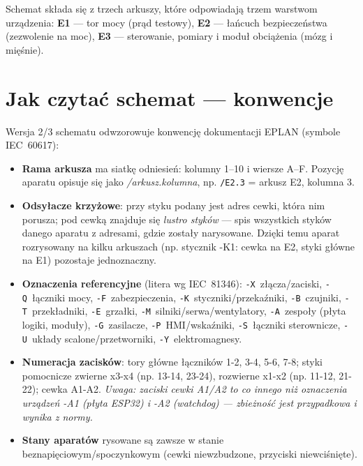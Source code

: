 \documentclass[11pt,a4paper]{article}
\begin{document}
Schemat składa się z trzech arkuszy, które odpowiadają trzem warstwom urządzenia:
\textbf{E1} --- tor mocy (prąd testowy), \textbf{E2} --- łańcuch bezpieczeństwa (zezwolenie na moc),
\textbf{E3} --- sterowanie, pomiary i moduł obciążenia (mózg i mięśnie).

\section{Jak czytać schemat --- konwencje}
\label{sec:konwencje}

Wersja 2/3 schematu odwzorowuje konwencję dokumentacji EPLAN (symbole IEC~60617):

\begin{itemize}
\item \textbf{Rama arkusza} ma siatkę odniesień: kolumny 1--10 i wiersze A--F. Pozycję aparatu
opisuje się jako \emph{/arkusz.kolumna}, np. \texttt{/E2.3} = arkusz E2, kolumna 3.
\item \textbf{Odsyłacze krzyżowe}: przy styku podany jest adres cewki, która nim porusza; pod cewką
znajduje się \emph{lustro styków} --- spis wszystkich styków danego aparatu z adresami, gdzie
zostały narysowane. Dzięki temu aparat rozrysowany na kilku arkuszach (np. stycznik -K1: cewka na
E2, styki główne na E1) pozostaje jednoznaczny.
\item \textbf{Oznaczenia referencyjne} (litera wg IEC~81346): \texttt{-X}~złącza/zaciski,
\texttt{-Q}~łączniki mocy, \texttt{-F}~zabezpieczenia, \texttt{-K}~styczniki/przekaźniki,
\texttt{-B}~czujniki, \texttt{-T}~przekładniki, \texttt{-E}~grzałki, \texttt{-M}~silniki/serwa/wentylatory,
\texttt{-A}~zespoły (płyta logiki, moduły), \texttt{-G}~zasilacze, \texttt{-P}~HMI/wskaźniki,
\texttt{-S}~łączniki sterownicze, \texttt{-U}~układy scalone/przetworniki, \texttt{-Y}~elektromagnesy.
\item \textbf{Numeracja zacisków}: tory główne łączników 1-2, 3-4, 5-6, 7-8; styki pomocnicze
zwierne x3-x4 (np. 13-14, 23-24), rozwierne x1-x2 (np. 11-12, 21-22); cewka A1-A2.
\emph{Uwaga: zaciski cewki A1/A2 to co innego niż oznaczenia urządzeń -A1 (płyta ESP32) i -A2
(watchdog) --- zbieżność jest przypadkowa i wynika z normy.}
\item \textbf{Stany aparatów} rysowane są zawsze w stanie beznapięciowym/spoczynkowym
(cewki niewzbudzone, przyciski niewciśnięte).
\end{itemize}

\end{document}
